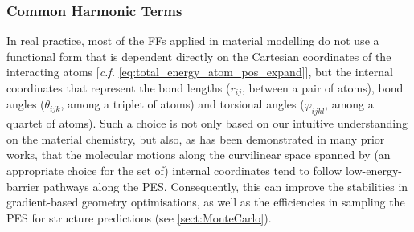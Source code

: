 \subsubsection{Common Harmonic Terms}
In real practice, most of the FFs applied in material modelling do not use a functional form  that is dependent directly on the Cartesian coordinates of the interacting atoms [\emph{c.f.} \cref{eq:total_energy_atom_pos_expand}], but the internal coordinates that represent the bond lengths ($r_{ij}$, between a pair of atoms), bond angles ($\theta_{ijk}$, among a triplet of atoms) and torsional angles ($\varphi_{ijkl}$, among a quartet of atoms). Such a choice is not only based on our intuitive understanding on the material chemistry, but also, as has been demonstrated in many prior works,\cite{baker1999geometry,buvcko2005geometry,echenique2006definition} that the molecular motions along the curvilinear space spanned by (an appropriate choice for the set of) internal coordinates tend to follow low-energy-barrier pathways along the PES. Consequently, this can improve the stabilities in gradient-based geometry optimisations, as well as the efficiencies in sampling the PES  for structure predictions (see \cref{sect:MonteCarlo}). 

